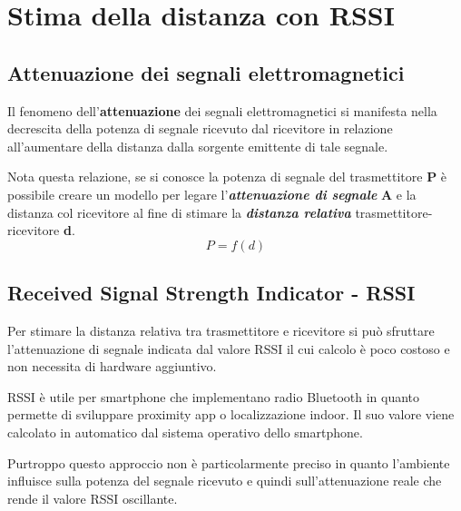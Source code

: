 \chapter{Stima della distanza con RSSI}

\section{Attenuazione dei segnali elettromagnetici}
Il fenomeno dell'\textbf{attenuazione} dei segnali elettromagnetici si manifesta nella decrescita della potenza di segnale ricevuto dal ricevitore in relazione all’aumentare della distanza dalla sorgente emittente di tale segnale.

Nota questa relazione, se si conosce la potenza di segnale del trasmettitore \textbf{P} è possibile creare un modello per legare l'\textbf{\textit{attenuazione di segnale}} \textbf{A} e la distanza col ricevitore al fine di stimare la \textbf{\textit{distanza relativa}} trasmettitore-ricevitore \textbf{d}.
\begin{equation}\label{eq:realazione_potenza_segnale}
	P = f(d) 
\end{equation}

\section{Received Signal Strength Indicator - RSSI}
Per stimare la distanza relativa tra trasmettitore e ricevitore si può sfruttare l'attenuazione di segnale indicata dal valore RSSI il cui calcolo è poco costoso e non necessita di hardware aggiuntivo. 

RSSI è utile per smartphone che implementano radio Bluetooth in quanto permette di sviluppare proximity app o localizzazione indoor. Il suo valore viene calcolato in automatico dal sistema operativo dello smartphone.

Purtroppo questo approccio non è particolarmente preciso in quanto l’ambiente influisce sulla potenza del segnale ricevuto e quindi sull'attenuazione reale che rende il valore RSSI oscillante.

